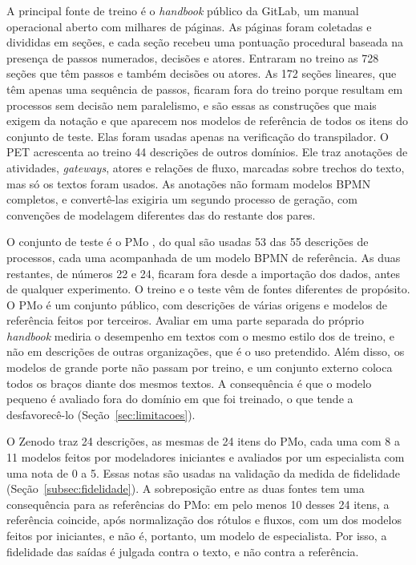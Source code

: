 A principal fonte de treino é o \textit{handbook} público da GitLab, um manual operacional aberto com milhares de páginas. As páginas foram coletadas e divididas em seções, e cada seção recebeu uma pontuação procedural baseada na presença de passos numerados, decisões e atores. Entraram no treino as 728 seções que têm passos e também decisões ou atores. As 172 seções lineares, que têm apenas uma sequência de passos, ficaram fora do treino porque resultam em processos sem decisão nem paralelismo, e são essas as construções que mais exigem da notação e que aparecem nos modelos de referência de todos os itens do conjunto de teste. Elas foram usadas apenas na verificação do transpilador. O PET \cite{bellan2022pet} acrescenta ao treino 44 descrições de outros domínios. Ele traz anotações de atividades, \textit{gateways}, atores e relações de fluxo, marcadas sobre trechos do texto, mas só os textos foram usados. As anotações não formam modelos BPMN completos, e convertê-las exigiria um segundo processo de geração, com convenções de modelagem diferentes das do restante dos pares.

O conjunto de teste é o PMo \cite{brissard2025pmo}, do qual são usadas 53 das 55 descrições de processos, cada uma acompanhada de um modelo BPMN de referência. As duas restantes, de números 22 e 24, ficaram fora desde a importação dos dados, antes de qualquer experimento. O treino e o teste vêm de fontes diferentes de propósito. O PMo é um conjunto público, com descrições de várias origens e modelos de referência feitos por terceiros. Avaliar em uma parte separada do próprio \textit{handbook} mediria o desempenho em textos com o mesmo estilo dos de treino, e não em descrições de outras organizações, que é o uso pretendido. Além disso, os modelos de grande porte não passam por treino, e um conjunto externo coloca todos os braços diante dos mesmos textos. A consequência é que o modelo pequeno é avaliado fora do domínio em que foi treinado, o que tende a desfavorecê-lo (Seção~\ref{sec:limitacoes}).

O Zenodo \cite{mangler2023textual} traz 24 descrições, as mesmas de 24 itens do PMo, cada uma com 8 a 11 modelos feitos por modeladores iniciantes e avaliados por um especialista com uma nota de 0 a 5. Essas notas são usadas na validação da medida de fidelidade (Seção~\ref{subsec:fidelidade}). A sobreposição entre as duas fontes tem uma consequência para as referências do PMo: em pelo menos 10 desses 24 itens, a referência coincide, após normalização dos rótulos e fluxos, com um dos modelos feitos por iniciantes, e não é, portanto, um modelo de especialista. Por isso, a fidelidade das saídas é julgada contra o texto, e não contra a referência.

